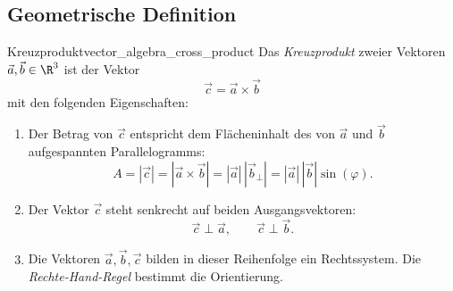 \subsection{Geometrische Definition}
\label{subsec:vector_algebra_cross_product_geometric_definition}

\begin{DefinitionBox}{Kreuzprodukt}{vector_algebra_cross_product}
  Das \emph{Kreuzprodukt}  zweier Vektoren
  $\vec a,\vec b\in\R^3$ ist der Vektor
  \[
    \vec c=\vec a\times\vec b
  \]
  mit den folgenden Eigenschaften:
  \begin{enumerate}[label=(\roman*),leftmargin=2.1em,itemsep=0.65em]
    \item
      \begin{minipage}[t]{0.49\linewidth}
        Der Betrag von $\vec c$ entspricht dem Flächeninhalt des von
        $\vec a$ und $\vec b$ aufgespannten Parallelogramms:
        \[
          A=|\vec c|=|\vec a \times \vec b|=|\vec a|\,|\vec b_{\perp}|=|\vec a|\,|\vec b|\sin(\varphi).
        \]
      \end{minipage}\hfill
      \begin{minipage}[t]{0.46\linewidth}
        \vspace{0pt}
        \centering
      \end{minipage}

    \item
      \begin{minipage}[t]{0.49\linewidth}
        Der Vektor $\vec c$ steht senkrecht auf beiden Ausgangsvektoren:
        \[
          \vec c\perp\vec a,
          \qquad
          \vec c\perp\vec b.
        \]
      \end{minipage}\hfill
      \begin{minipage}[t]{0.46\linewidth}
        \vspace{0pt}
        \centering
      \end{minipage}

    \item
      \begin{minipage}[t]{0.49\linewidth}
        Die Vektoren $\vec a,\vec b,\vec c$ bilden in dieser Reihenfolge ein
        Rechtssystem. Die \emph{Rechte-Hand-Regel}
         bestimmt die Orientierung.
      \end{minipage}\hfill
      \begin{minipage}[t]{0.46\linewidth}
        \vspace{0pt}
        \centering
      \end{minipage}
  \end{enumerate}
\end{DefinitionBox}

